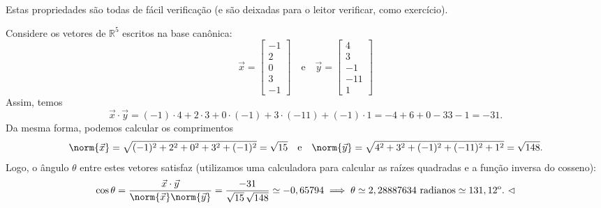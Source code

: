 Estas propriedades são todas de fácil verificação (e são deixadas para o leitor verificar, como exercício).

\begin{ex}
	Considere os vetores de $\mathbb{R}^5$ escritos na base canônica:
	\begin{equation}
	\vec{x} =
	\begin{bmatrix}
	-1 \\ 2 \\ 0 \\ 3 \\ -1
	\end{bmatrix} \quad \text{e} \quad \vec{y} =
	\begin{bmatrix}
	4 \\ 3 \\ -1 \\ -11 \\ 1
	\end{bmatrix}
	\end{equation} Assim, temos
	\begin{equation}
	\vec{x} \cdot \vec{y} = (-1)\cdot 4 + 2 \cdot 3 + 0 \cdot (-1) +3 \cdot(-11) + (-1)\cdot 1 = -4 + 6 +0 -33 -1 = -31.
	\end{equation} Da mesma forma, podemos calcular os comprimentos
	\begin{equation}
	\norm{\vec{x}} = \sqrt{(-1)^2 + 2^2 + 0^2 + 3^2 + (-1)^2} = \sqrt{15} \quad \text{e} \quad \norm{\vec{y}} = \sqrt{4^2 + 3^2 + (-1)^2 + (-11)^2 + 1^2} = \sqrt{148}.
	\end{equation} Logo, o ângulo $\theta$ entre estes vetores satisfaz (utilizamos uma calculadora para calcular as raízes quadradas e a função inversa do cosseno):
	\begin{equation}
	\cos \theta = \frac{\vec{x} \cdot \vec{y}}{\norm{\vec{x}} \norm{\vec{y}}} = \frac{-31}{\sqrt{15} \, \sqrt{148}} \simeq -0,65794 \implies  \theta \simeq 2,28887634 \textrm{ radianos} \simeq 131,12^{\text{o}}. \ \lhd
	\end{equation}
\end{ex}

